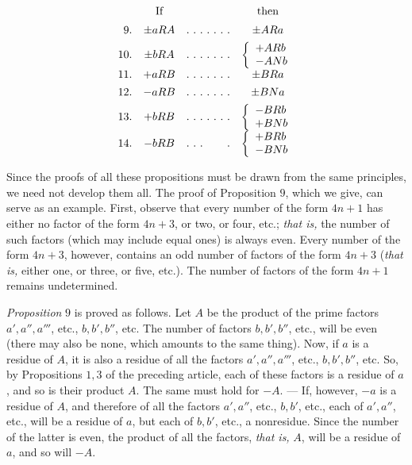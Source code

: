 \[
\begin{array}{rccc}&\text{If}&&\text{then}\\[5pt]
9.&\pm aRA&\mathinner{.\ .\ .\ .\ .\ .\ .}&\pm ARa\\[4pt]
10.&\pm bRA&\mathinner{.\ .\ .\ .\ .\ .\ .}&\left\{\begin{array}{l}+ARb\\-ANb\end{array}\right.\\[4pt]
11.&+aRB&\mathinner{.\ .\ .\ .\ .\ .\ .}&\pm BRa\\[4pt]
12.&-aRB&\mathinner{.\ .\ .\ .\ .\ .\ .}&\pm BNa\\[4pt]
13.&+bRB&\mathinner{.\ .\ .\ .\ .\ .\ .}&\left\{\begin{array}{l}-BRb\\+BNb\end{array}\right.\\[4pt]
14.&-bRB&\mathinner{.\ .\ .\ \phantom{.\ .\ .}\ .}&\left\{\begin{array}{l}+BRb\\-BNb\end{array}\right.\\[4pt]
\end{array}
\]

Since the proofs of all these propositions must be drawn from the same principles, we need not develop them all. The proof of Proposition $9$, which we give, can serve as an example. First, observe that every number of the form $4n+1$ has either no factor of the form $4n+3$, or two, or four, etc.; \emph{that is,} the number of such factors (which may include equal ones) is always even. Every number of the form $4n+3$, however, contains an odd number of factors of the form $4n+3$ (\emph{that is,} either one, or three, or five, etc.). The number of factors of the form $4n+1$ remains undetermined.

\emph{Proposition} $9$ is proved as follows. Let $A$ be the product of the prime factors $a',a'',a'''$, etc., $b,b',b''$, etc. The number of factors $b,b',b''$, etc., will be even (there may also be none, which amounts to the same thing). Now, if $a$ is a residue of $A$, it is also a residue of all the factors $a',a'',a'''$, etc., $b,b',b''$, etc. So, by Propositions $1,3$ of the preceding article, each of these factors is a residue of $a$, and so is their product $A$. The same must hold for $-A$. --- If, however, $-a$ is a residue of $A$, and therefore of all the factors $a',a''$, etc., $b,b'$, etc., each of $a',a''$, etc., will be a residue of $a$, but each of $b,b'$, etc., a nonresidue. Since the number of the latter is even, the product of all the factors, \emph{that is,} $A$, will be a residue of $a$, and so will $-A$.

